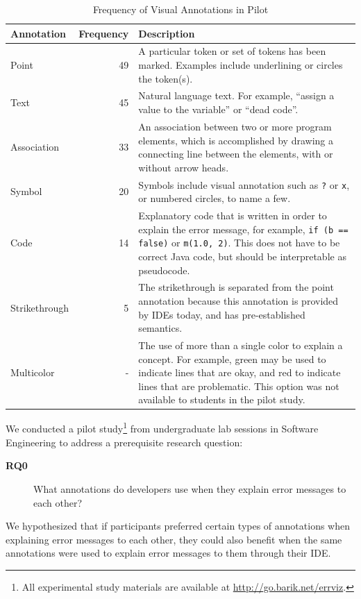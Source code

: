 \documentclass[conference]{IEEEtran}
\begin{document}
\begin{table}[!t]
\caption{Frequency of Visual Annotations in Pilot\label{tab:pilot}}
\centering
\begin{tabularx}{\columnwidth}{lrX}
\toprule
Annotation & Frequency & Description\\
\midrule
Point & 49 & A particular token or set of tokens has been marked. Examples include underlining or circles the token(s).\\
[0.2cm]
Text & 45 & Natural language text. For example, ``assign a value to the variable'' or ``dead code''.\\
[0.2cm]
Association & 33 & An association between two or more program elements, which is accomplished by drawing a connecting line between the elements, with or without arrow heads.\\
[0.2cm]
Symbol & 20 & Symbols include visual annotation such as \texttt{?} or \texttt{x}, or numbered circles, to name a few.\\
[0.2cm]
Code & 14 & Explanatory code that is written in order to explain the error message, for example, \texttt{if (b == false)} or \texttt{m(1.0, 2)}. This does not have to be correct Java code, but should be interpretable as pseudocode.\\
[0.2cm]
Strikethrough & 5 & The strikethrough is separated from the point annotation because this annotation is provided by IDEs today, and has pre-established semantics.
\\
[0.2cm]
Multicolor & - & The use of more than a single color to explain a concept. For example, green may be used to indicate lines that are okay, and red to indicate lines that are problematic. This option was not available to students in the pilot study.\\
[0.2cm]
\bottomrule
\end{tabularx}
\end{table}

We conducted a pilot study\footnote{All experimental study materials are available at \url{http://go.barik.net/errviz}.} from undergraduate lab sessions in Software Engineering to address a prerequisite research question:
\begin{description}
\item[\textbf{RQ0}] What annotations do developers use when they explain error messages to each other?
\end{description}

We hypothesized that if participants preferred certain types of annotations when explaining error messages to each other, they could also benefit when the same annotations were used to explain error messages to them through their IDE.
\end{document}

